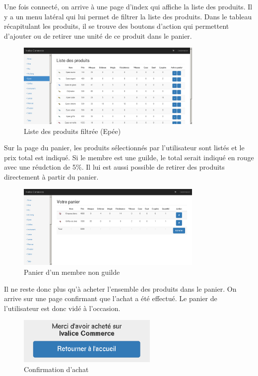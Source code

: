 Une fois connecté, on arrive à une page d'index qui affiche la liste des produits. 
Il y a un menu latéral qui lui permet de filtrer la liste des produits. Dans le 
tableau récapitulant les produits, il se trouve des boutons d'action qui 
permettent d'ajouter ou de retirer une unité de ce produit dans le panier. \\

\begin{figure}[h!]
	\centering
	\includegraphics[width=0.8\textwidth]{img/index.png}
	\caption{Liste des produits filtrée (Epée)}
\end{figure}

\newpage
Sur la page du panier, les produits sélectionnés par l'utilisateur sont listés 
et le prix total est indiqué. Si le membre est une guilde, le total serait 
indiqué en rouge avec une réudction de 5\%. Il lui est aussi possible de 
retirer des produits directement à partir du panier. \\

\begin{figure}[h!]
	\centering
	\includegraphics[width=0.8\textwidth]{img/cart.png}
	\caption{Panier d'un membre non guilde}
\end{figure}

Il ne reste donc plus qu'à acheter l'ensemble des produits dans le panier. On 
arrive sur une page confirmant que l'achat a été effectué. Le panier de 
l'utilisateur est donc vidé à l'occasion. \\

\begin{figure}[h!]
	\centering
	\includegraphics[width=0.6\textwidth]{img/buy.png}
	\caption{Confirmation d'achat}
\end{figure}

